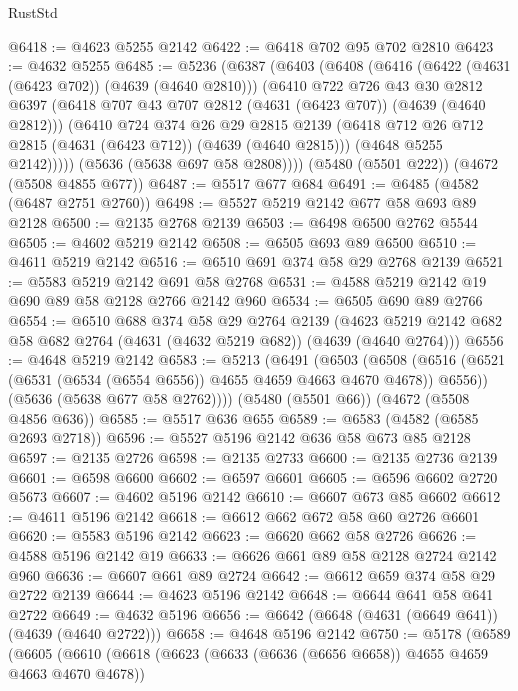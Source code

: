 \begin{lexlean}{RustStd}
\begin{coremodule}
{\begin{coremodule}
{{{{{{{{{{{{{{{{@6418 := @4623 @5255 @2142
@6422 := @6418 @702 @95 @702 @2810
@6423 := @4632 @5255
@6485 := @5236
    (@6387
      (@6403
        (@6408
          (@6416
            (@6422 (@4631 (@6423 @702)) (@4639 (@4640 @2810)))
            (@6410
              @722
              @726
              @43
              @30
              @2812
              @6397
              (@6418 @707 @43 @707 @2812 (@4631 (@6423 @707)) (@4639 (@4640 @2812)))
              (@6410
                @724
                @374
                @26
                @29
                @2815
                @2139
                (@6418 @712 @26 @712 @2815 (@4631 (@6423 @712)) (@4639 (@4640 @2815)))
                (@4648 @5255 @2142)))))
        (@5636 (@5638 @697 @58 @2808))))
    (@5480 (@5501 @222))
    (@4672 (@5508 @4855 @677))
@6487 := @5517 @677 @684
@6491 := @6485 (@4582 (@6487 @2751 @2760))
@6498 := @5527 @5219 @2142 @677 @58 @693 @89 @2128
@6500 := @2135 @2768 @2139
@6503 := @6498 @6500 @2762 @5544
@6505 := @4602 @5219 @2142
@6508 := @6505 @693 @89 @6500
@6510 := @4611 @5219 @2142
@6516 := @6510 @691 @374 @58 @29 @2768 @2139
@6521 := @5583 @5219 @2142 @691 @58 @2768
@6531 := @4588 @5219 @2142 @19 @690 @89 @58 @2128 @2766 @2142 @960
@6534 := @6505 @690 @89 @2766
@6554 := @6510
    @688
    @374
    @58
    @29
    @2764
    @2139
    (@4623 @5219 @2142 @682 @58 @682 @2764 (@4631 (@4632 @5219 @682)) (@4639 (@4640 @2764)))
@6556 := @4648 @5219 @2142
@6583 := @5213
    (@6491
      (@6503
        (@6508 (@6516 (@6521 (@6531 (@6534 (@6554 @6556)) @4655 @4659 @4663 @4670 @4678)) @6556))
        (@5636 (@5638 @677 @58 @2762))))
    (@5480 (@5501 @66))
    (@4672 (@5508 @4856 @636))
@6585 := @5517 @636 @655
@6589 := @6583 (@4582 (@6585 @2693 @2718))
@6596 := @5527 @5196 @2142 @636 @58 @673 @85 @2128
@6597 := @2135 @2726
@6598 := @2135 @2733
@6600 := @2135 @2736 @2139
@6601 := @6598 @6600
@6602 := @6597 @6601
@6605 := @6596 @6602 @2720 @5673
@6607 := @4602 @5196 @2142
@6610 := @6607 @673 @85 @6602
@6612 := @4611 @5196 @2142
@6618 := @6612 @662 @672 @58 @60 @2726 @6601
@6620 := @5583 @5196 @2142
@6623 := @6620 @662 @58 @2726
@6626 := @4588 @5196 @2142 @19
@6633 := @6626 @661 @89 @58 @2128 @2724 @2142 @960
@6636 := @6607 @661 @89 @2724
@6642 := @6612 @659 @374 @58 @29 @2722 @2139
@6644 := @4623 @5196 @2142
@6648 := @6644 @641 @58 @641 @2722
@6649 := @4632 @5196
@6656 := @6642 (@6648 (@4631 (@6649 @641)) (@4639 (@4640 @2722)))
@6658 := @4648 @5196 @2142
@6750 := @5178
    (@6589
      (@6605
        (@6610
          (@6618
            (@6623 (@6633 (@6636 (@6656 @6658)) @4655 @4659 @4663 @4670 @4678))
}}}}}}}}}}}}}}}}
\end{coremodule}}
\end{coremodule}
\end{lexlean}
